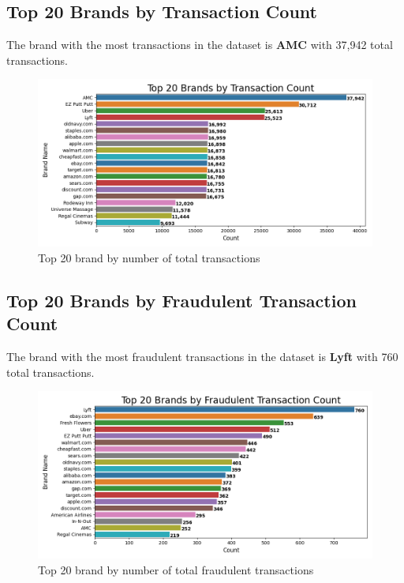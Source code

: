 \documentclass[12pt]{article}
\begin{document}
\newpage
\subsection{Top 20 Brands by Transaction Count}
The brand with the most transactions in the dataset is \textbf{AMC} with 37,942 total transactions. 
\begin{figure}[h]
    \centering
    \includegraphics[width=\textwidth]{images/top_20_merchants_by_count.png}
    \caption{Top 20 brand by number of total transactions}
    \label{fig:my_label}
\end{figure}

\newpage
\subsection{Top 20 Brands by Fraudulent Transaction Count}
The brand with the most fraudulent transactions in the dataset is \textbf{Lyft} with 760 total transactions. 

\begin{figure}[h]
    \centering
    \includegraphics[width=\textwidth]{images/top_20_merchants_by_fraudulent_count.png}
    \caption{Top 20 brand by number of total fraudulent transactions}
    \label{fig:my_label}
\end{figure}
\end{document}
